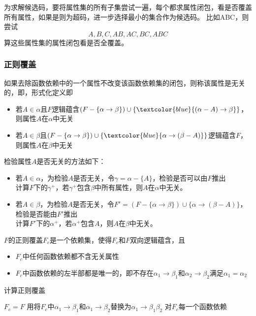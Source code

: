 \begin{example}
为求解候选码，要将属性集的所有子集尝试一遍，每个都求属性闭包，看是否覆盖所有属性，如果是则为超码，进一步选择最小的集合作为候选码。
比如ABC，则尝试
\[A,B,C,AB,AC,BC,ABC\]
算这些属性集的属性闭包看是否全覆盖。
\end{example}

\subsubsection{正则覆盖}
\begin{definition}[无关(extraneous)]
如果去除函数依赖中的一个属性不改变该函数依赖集的闭包，则称该属性是无关的，即，形式化定义即
\begin{itemize}
	\item 若$A\in\alpha$且$F$逻辑蕴含$(F-\{\alpha\to\beta\})\cup\{\textcolor{blue}{(\alpha-A)\to\beta}\}$，则属性$A$在$\alpha$中无关
	\item 若$A\in\beta$且$(F-\{\alpha\to\beta\})\cup\{\textcolor{blue}{\alpha\to(\beta-A)}\}$逻辑蕴含$F$，则属性$A$在$\beta$中无关
\end{itemize}
\end{definition}

检验属性$A$是否无关的方法如下：
\begin{itemize}
	\item 若$A\in\alpha$，为检验$A$是否无关，令$\gamma=\alpha-\{A\}$，检验\textemph{$\gamma\to\beta$}是否可以由$F$推出\\
	计算$F$下的$\gamma^+$，若$\gamma^+$包含$\beta$中所有属性，则$A$在$\alpha$中无关。
	\item 若$A\in\beta$，为检验$A$是否无关，令$F'=(F-\{\alpha\to\beta\})\cup\{\alpha\to(\beta-A)\}$，检验是否能由$F'$推出\\
	计算$F'$下的$\alpha^+$，若$\alpha^+$包含$A$，则$A$在$\beta$中无关。
\end{itemize}

\begin{definition}
$F$的正则覆盖$F_c$是一个依赖集，使得$F_c$和$F$双向逻辑蕴含，且
\begin{itemize}
	\item $F_c$中任何函数依赖都不含无关属性
	\item $F_c$中函数依赖的左半部都是唯一的，即不存在$\alpha_1\to\beta_1$和$\alpha_2\to\beta_2$满足$\alpha_1=\alpha_2$
\end{itemize}
\end{definition}
\begin{algorithm}
\caption{计算正则覆盖}
\begin{algorithmic}[1]
\State $F_c=F$
\Repeat
\State 用将$F_c$中$\alpha_1\to\beta_1$和$\alpha_1\to\beta_2$替换为$\alpha_1\to\beta_1\beta_2$
\State 对$F_c$每一个函数依赖
\end{algorithmic}
\end{algorithm}

